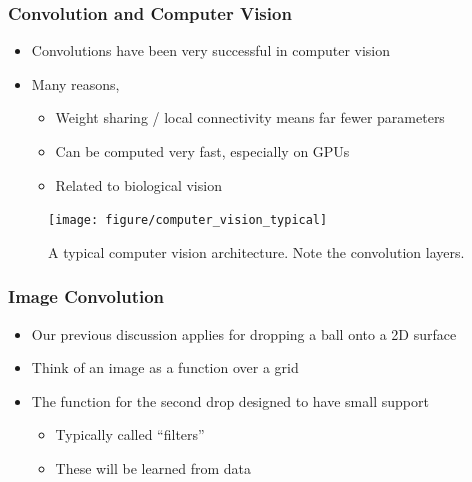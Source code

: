 \documentclass[10pt,mathserif]{beamer}
\begin{document}
\begin{frame}
  \frametitle{Convolution and Computer Vision}
  \begin{itemize}
  \item Convolutions have been very successful in computer vision
  \item Many reasons,
    \begin{itemize}
    \item Weight sharing / local connectivity means far fewer parameters
    \item Can be computed very fast, especially on GPUs
    \item Related to biological vision
    \end{itemize}
  \end{itemize}
\begin{figure}[ht]
  \centering
  \texttt{[image: figure/computer\_vision\_typical]}
  \caption{A typical computer vision architecture. Note the convolution
    layers. \label{fig:label} }
\end{figure}
\end{frame}

\begin{frame}
  \frametitle{Image Convolution}
  \begin{itemize}
  \item Our previous discussion applies for dropping a ball onto a 2D surface
  \item Think of an image as a function over a grid
  \item The function for the second drop designed to have small support
    \begin{itemize}
    \item Typically called ``filters''
    \item These will be learned from data
    \end{itemize}  
  \end{itemize}
\end{frame}

\end{document}
